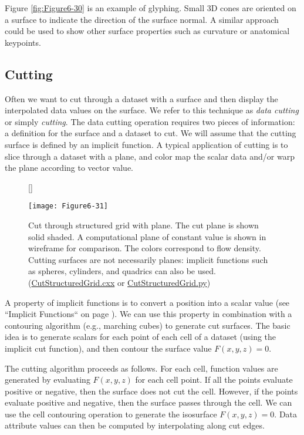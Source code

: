 Figure \ref{fig:Figure6-30} is an example of glyphing. Small 3D cones are oriented on a surface to indicate the direction of the surface normal. A similar approach could be used to show other surface properties such as curvature or anatomical keypoints.

\subsection{Cutting}
\label{subsec:cutting}

Often we want to cut through a dataset with a surface and then display the interpolated data values on the surface. We refer to this technique as \emph{data cutting} or simply \emph{cutting}. The data cutting operation requires two pieces of information: a definition for the surface and a dataset to cut. We will assume that the cutting surface is defined by an implicit function. A typical application of cutting is to slice through a dataset with a plane, and color map the scalar data and/or warp the plane according to vector value.

\begin{figure}[!htb]
	[\FBwidth]
	{\caption{ Cut through structured grid with plane. The cut plane is shown solid shaded. A computational plane of constant value is shown in wireframe for comparison. The colors correspond to flow density. Cutting surfaces are not necessarily planes: implicit functions such as spheres, cylinders, and quadrics can also be used. (\href{https://lorensen.github.io/VTKExamples/site/Cxx/VisualizationAlgorithms/CutStructuredGrid/}{CutStructuredGrid.cxx} or \href{https://lorensen.github.io/VTKExamples/site/Python/VisualizationAlgorithms/CutStructuredGrid/}{CutStructuredGrid.py})}\label{fig:Figure6-31}}
	{\texttt{[image: Figure6-31]}}
\end{figure}

A property of implicit functions is to convert a position into a scalar value (see ``Implicit Functions`` on page \pageref{subsec:implicit_functions} ). We can use this property in combination with a contouring algorithm (e.g., marching cubes) to generate cut surfaces. The basic idea is to generate scalars for each point of each cell of a dataset (using the implicit cut function), and then contour the surface value $F(x,y,z) = 0$.

The cutting algorithm proceeds as follows. For each cell, function values are generated by evaluating $F(x,y,z)$ for each cell point. If all the points evaluate positive or negative, then the surface does not cut the cell. However, if the points evaluate positive and negative, then the surface passes through the cell. We can use the cell contouring operation to generate the isosurface $F(x,y,z) = 0$. Data attribute values can then be computed by interpolating along cut edges.

